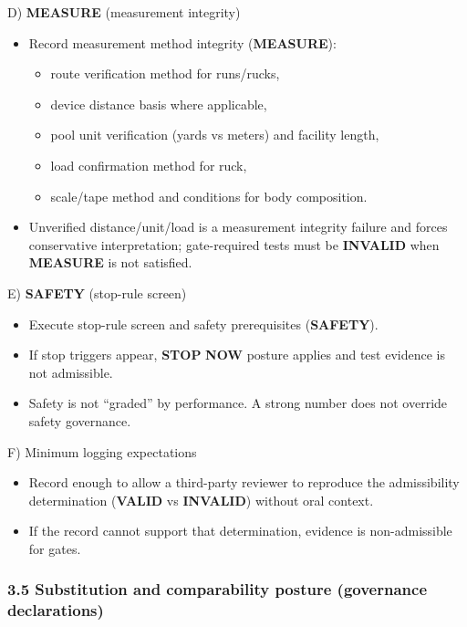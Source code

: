 \documentclass[10pt]{article}
\begin{document}
D) \textbf{MEASURE} (measurement integrity)

\begin{itemize}
\item Record measurement method integrity (\textbf{MEASURE}):
  \begin{itemize}
  \item route verification method for runs/rucks,
  \item device distance basis where applicable,
  \item pool unit verification (yards vs meters) and facility length,
  \item load confirmation method for ruck,
  \item scale/tape method and conditions for body composition.
  \end{itemize}
\item Unverified distance/unit/load is a measurement integrity failure and forces conservative interpretation; gate-required tests must be \textbf{INVALID} when \textbf{MEASURE} is not satisfied.
\end{itemize}

E) \textbf{SAFETY} (stop-rule screen)

\begin{itemize}
\item Execute stop-rule screen and safety prerequisites (\textbf{SAFETY}).
\item If stop triggers appear, \textbf{STOP} \textbf{NOW} posture applies and test evidence is not admissible.
\item Safety is not “graded” by performance. A strong number does not override safety governance.
\end{itemize}

F) Minimum logging expectations

\begin{itemize}
\item Record enough to allow a third-party reviewer to reproduce the admissibility determination (\textbf{VALID} vs \textbf{INVALID}) without oral context.
\item If the record cannot support that determination, evidence is non-admissible for gates.
\end{itemize}

\subsubsection*{3.5 Substitution and comparability posture (governance declarations)}
\end{document}
